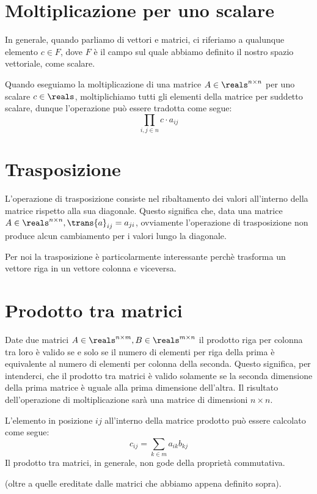 \section{Moltiplicazione per uno scalare}
In generale, quando parliamo di vettori e matrici, ci riferiamo a qualunque elemento $c \in F$, dove $F$ è il campo sul quale abbiamo definito il nostro spazio vettoriale, come scalare.

Quando eseguiamo la moltiplicazione di una matrice $A \in \reals^{n \times n}$ per uno scalare $c \in \reals$, moltiplichiamo tutti gli elementi della matrice per suddetto scalare, dunque l'operazione può essere tradotta come segue:
\begin{equation*}
    \prod_{i, j \in n} c \cdot a_{ij}
\end{equation*}
\section{Trasposizione}
L'operazione di trasposizione consiste nel ribaltamento dei valori all'interno della matrice rispetto alla sua diagonale. Questo significa che, data una matrice $A \in \reals^{n \times n}, \trans{a}_{ij} = a_{ji}$, ovviamente l'operazione di trasposizione non produce alcun cambiamento per i valori lungo la diagonale.

Per noi la trasposizione è particolarmente interessante perchè trasforma un vettore riga in un vettore colonna e viceversa.
\section{Prodotto tra matrici}
Date due matrici $A \in \reals^{n \times m}, B \in \reals^{m \times n}$ il prodotto riga per colonna tra loro è valido se e solo se il numero di elementi per riga della prima è equivalente al numero di elementi per colonna della seconda. Questo significa, per intenderci, che il prodotto tra matrici è valido solamente se la seconda dimensione della prima matrice è uguale alla prima dimensione dell'altra.
Il risultato dell'operazione di moltiplicazione sarà una matrice di dimensioni $n \times n$.

L'elemento in posizione $ij$ all'interno della matrice prodotto può essere calcolato come segue:
\begin{equation*}
    c_{ij} = \sum_{k \in m}a_{ik}b_{kj}
\end{equation*}
Il prodotto tra matrici, in generale, non gode della proprietà commutativa.

 (oltre a quelle ereditate dalle matrici che abbiamo appena definito sopra).
